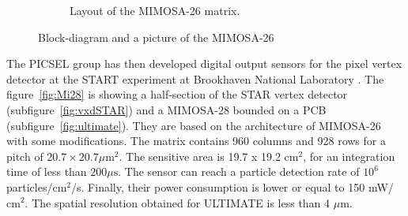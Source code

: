 \begin{figure}[!h]
\begin{subfigure}[t]{0.4\textwidth}
        \caption{Layout of the MIMOSA-26 matrix.}
        \label{fig:archMi26}
    \end{subfigure}
    \caption{Block-diagram and a picture of the MIMOSA-26}\label{fig:Mi26}
    \end{figure}    



    The PICSEL group has then developed digital output sensors for the pixel vertex detector at the START experiment at Brookhaven National Laboratory \cite{1748-0221-7-01-C01102}.
    The figure~\ref{fig:Mi28} is showing a half-section of the STAR vertex detector (subfigure~\ref{fig:vxdSTAR}) and a \gls{MIMOSA}-28 bounded on a PCB (subfigure~\ref{fig:ultimate}).
    They are based on the architecture of \gls{MIMOSA}-26 with some modifications.
    The matrix contains 960 columns and 928 rows for a pitch of $20.7 \times 20.7 \mu\text{m}^2$.
    The sensitive area is 19.7 x 19.2 $\text{cm}^2$, for an integration time of less than $200\mu\text{s}$.
    The sensor can reach a particle detection rate of $10^6$ particles/$\text{cm}^2$/s. 
    Finally, their power consumption is lower or equal to 150 mW/$\text{cm}^2$.
    The spatial resolution obtained for ULTIMATE is less than 4 $\mu\text{m}$.

  


